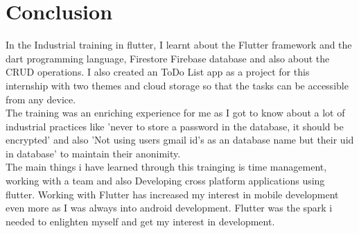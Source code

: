 \chapter{Conclusion}
 In the Industrial training in flutter, I learnt about the Flutter framework and the dart programming language, Firestore Firebase database and also about the CRUD operations. I also created an ToDo List app as a project for this internship with two themes and cloud storage so that the tasks can be accessible from any device.\\
 
 The training was an enriching experience for me as I got to know about a lot of industrial practices like 'never to store a password in the database, it should be encrypted' and also 'Not using users gmail id's as an database name but their uid in database' to maintain their anonimity.\\
 
 The main things i have learned through this trainging is time management, working with a team and also Developing cross platform applications using flutter. Working with Flutter has increased my interest in mobile development even more as I was always into android development. Flutter was the spark i needed to enlighten myself and get my interest in development.\\